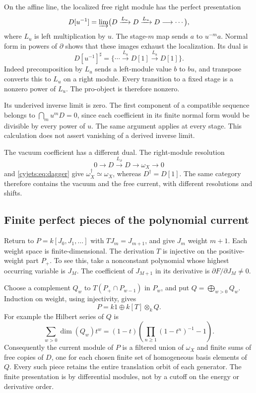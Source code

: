 On the affine line, the localized free right module has the perfect
presentation
\begin{equation}\label{cyjets:eq:localization}
 D[u^{-1}]=\varinjlim
       \bigl(D\xrightarrow{L_u}D\xrightarrow{L_u}D\longrightarrow\cdots\bigr),
\end{equation}
where $L_u$ is left multiplication by $u$. The stage-$m$ map
sends $a$ to $u^{-m}a$. Normal form in powers of $\partial$
shows that these images exhaust the localization. Its dual is
\begin{equation}\label{cyjets:eq:dual-tower}
 D[u^{-1}]^\sharp=
       \{\cdots\xrightarrow{L_u}D[1]\xrightarrow{L_u}D[1]\}.
\end{equation}
Indeed precomposition by $L_u$ sends a left-module value $b$ to
$bu$, and transpose converts this to $L_u$ on a right module.
Every transition to a fixed stage is a nonzero power of $L_u$.
The pro-object is therefore nonzero.

Its underived inverse limit is zero. The first component of a
compatible sequence belongs to $\bigcap_m u^mD=0$, since each
coefficient in its finite normal form would be divisible by every
power of $u$. The same argument applies at every stage. This
calculation does not assert vanishing of a derived inverse limit.

The vacuum coefficient has a different dual. The right-module
resolution
\[
 0\longrightarrow D\xrightarrow{L_\partial}D
                  \longrightarrow\omega_X\longrightarrow0
\]
and \eqref{cyjets:eq:dagger} give
$\omega_X^\dagger\simeq\omega_X$, whereas $D^\dagger=D[1]$.
The same category therefore contains the vacuum and the free
current, with different resolutions and shifts.

\subsection{Finite perfect pieces of the polynomial current}

Return to $P=k[J_0,J_1,\ldots]$ with $TJ_m=J_{m+1}$, and give
$J_m$ weight $m+1$. Each weight space is finite-dimensional.
The derivation $T$ is injective on the positive-weight part $P_+$.
To see this, take a nonconstant polynomial whose highest occurring
variable is $J_M$. The coefficient of $J_{M+1}$ in its derivative
is $\partial F/\partial J_M\ne0$.

Choose a complement $Q_w$ to $T(P_+\cap P_{w-1})$ in $P_w$,
and put $Q=\bigoplus_{w>0}Q_w$. Induction on weight, using
injectivity, gives
\begin{equation}\label{cyjets:eq:free-current-presentation}
 P=k1\oplus k[T]\otimes_kQ.
\end{equation}
For example the Hilbert series of $Q$ is
\[
 \sum_{w>0}\dim(Q_w)t^w
   =(1-t)\left(\prod_{n\geq1}(1-t^n)^{-1}-1\right).
\]
Consequently the current module of $P$ is a filtered union of
$\omega_X$ and finite sums of free copies of $D$, one for each
chosen finite set of homogeneous basis elements of $Q$.
Every such piece retains the entire translation orbit of each
generator. The finite presentation is by differential modules,
not by a cutoff on the energy or derivative order.

